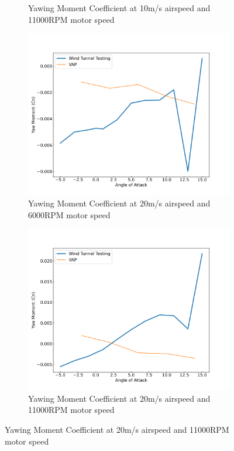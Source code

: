 \begin{figure}[H]
\begin{subfigure}[b]{0.467\textwidth}
        \caption{Yawing Moment Coefficient at 10m/s airspeed and 11000RPM motor speed}
        \label{fig:VAP_tractor_10ms_11000}
    \end{subfigure}
    \begin{subfigure}[b]{0.467\textwidth}
        \centering
        \includegraphics[width=\textwidth]{05_Results/VAP/tractor/Cn/20ms_6000RPM_Cn.png}
        \caption{Yawing Moment Coefficient at 20m/s airspeed and 6000RPM motor speed}
        \label{fig:VAP_Cn_20ms_6000}
    \end{subfigure}
    \begin{subfigure}[b]{0.467\textwidth}
        \centering
        \includegraphics[width=\textwidth]{05_Results/VAP/tractor/Cn/20ms_11000RPM_Cn.png}
        \caption{Yawing Moment Coefficient at 20m/s airspeed and 11000RPM motor speed}
        \label{fig:VAP_Cn_20ms_11000}
    \end{subfigure}
\end{figure}


